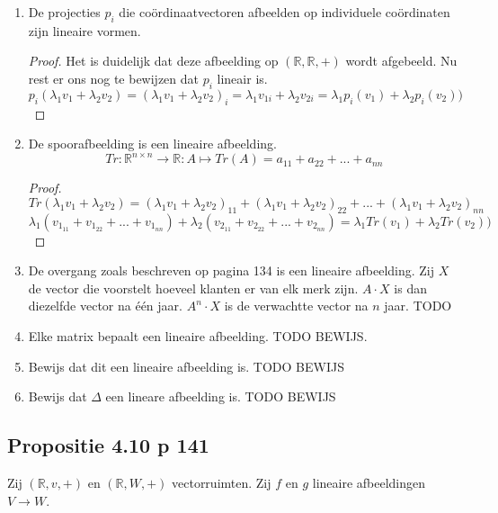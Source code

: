 \documentclass[lineaire_algebra_oplossingen.tex]{subfiles}
\begin{document}
\begin{enumerate}
\begin{itemize}
\begin{proof}
\[
f(\lambda_1v_1+\lambda_2v_2) = (a\lambda_1v_{1x}+b\lambda_1(v_{1y})+(a\lambda_2v_{2x}+b\lambda_2v_{2y})
\]
\[
= \lambda_1(av_{1x}+bv_{1y})+\lambda_2(av_{2x}+bv_{2y}) = \lambda_1f(v_1)+\lambda_2f(v_2))
\]
\end{proof}
\item De volgende afbeelding is niet lineair
\[g: \mathbb{R}^2 \rightarrow \mathbb{R}: (x,y) \mapsto ax+by+c\]
\begin{proof}
De nulvector $\vec{0}$ wordt niet op zichzelf afgebeeld maar op $c$.
\end{proof}
\end{itemize}
\item De projecties $p_i$ die co\"ordinaatvectoren afbeelden op individuele co\"ordinaten zijn lineaire vormen.
\begin{proof}
Het is duidelijk dat deze afbeelding op $(\mathbb{R},\mathbb{R},+)$ wordt afgebeeld. Nu rest er ons nog te bewijzen dat $p_i$ lineair is.
\[
p_i(\lambda_1v_1+\lambda_2v_2) = (\lambda_1v_1+\lambda_2v_2)_i
= \lambda_1v_{1i}+\lambda_2v_{2i} = \lambda_1p_i(v_1)+\lambda_2p_i(v_2))
\]
\end{proof}
\item De spoorafbeelding is een lineaire afbeelding.
\[
Tr:\mathbb{R}^{n\times n}\rightarrow \mathbb{R}:A\mapsto Tr(A)=a_{11}+a_{22}+...+a_{nn}
\]
\begin{proof}
\[
Tr(\lambda_1v_1+\lambda_2v_2) = (\lambda_1v_1+\lambda_2v_2)_{11}+(\lambda_1v_1+\lambda_2v_2)_{22}+...+(\lambda_1v_1+\lambda_2v_2)_{nn}
\]
\[
\lambda_1 (v_{1_{11}}+v_{1_{22}}+...+v_{1_{nn}}) + \lambda_2 (v_{2_{11}}+v_{2_{22}}+...+v_{2_{nn}}) = \lambda_1Tr(v_1)+\lambda_2Tr(v_2))
\]
\end{proof}
\item De overgang zoals beschreven op pagina 134 is een lineaire afbeelding.
Zij $X$ de vector die voorstelt hoeveel klanten er van elk merk zijn.
$A\cdot X$ is dan diezelfde vector na \'e\'en jaar. $A^n\cdot X$ is de verwachtte vector na $n$ jaar.
TODO
\item Elke matrix bepaalt een lineaire afbeelding.
TODO BEWIJS.
\item Bewijs dat dit een lineaire afbeelding is.
TODO BEWIJS
\item Bewijs dat $\Delta$ een lineare afbeelding is.
TODO BEWIJS
\end{enumerate}
\subsection{Propositie 4.10 p 141}
Zij $(\mathbb{R},v,+)$ en $(\mathbb{R},W,+)$ vectorruimten. Zij $f$ en $g$ lineaire afbeeldingen $V\rightarrow W$.
\end{document}
